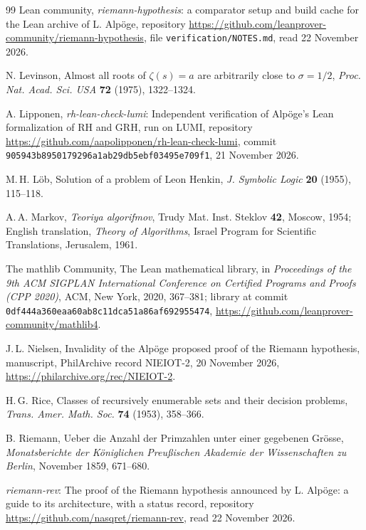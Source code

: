 \documentclass[11pt]{article}
\theoremstyle{definition}
\theoremstyle{remark}
\begin{document}
\begin{thebibliography}{99}
 Lean community, \emph{riemann-hypothesis}: a comparator setup and build cache for the Lean archive of L. Alp\"oge, repository \url{https://github.com/leanprover-community/riemann-hypothesis}, file \nolinkurl{verification/NOTES.md}, read 22 November 2026.

 N. Levinson, Almost all roots of $\zeta(s)=a$ are arbitrarily close to $\sigma=1/2$, \emph{Proc. Nat. Acad. Sci. USA} \textbf{72} (1975), 1322--1324.

 A. Lipponen, \emph{rh-lean-check-lumi}: Independent verification of Alp\"oge's Lean formalization of RH and GRH, run on LUMI, repository \url{https://github.com/aapolipponen/rh-lean-check-lumi}, commit \nolinkurl{905943b8950179296a1ab29db5ebf03495e709f1}, 21 November 2026.

 M.\,H. L\"ob, Solution of a problem of Leon Henkin, \emph{J. Symbolic Logic} \textbf{20} (1955), 115--118.

 A.\,A. Markov, \emph{Teoriya algorifmov}, Trudy Mat. Inst. Steklov \textbf{42}, Moscow, 1954; English translation, \emph{Theory of Algorithms}, Israel Program for Scientific Translations, Jerusalem, 1961.

 The mathlib Community, The Lean mathematical library, in \emph{Proceedings of the 9th ACM SIGPLAN International Conference on Certified Programs and Proofs (CPP 2020)}, ACM, New York, 2020, 367--381; library at commit \nolinkurl{0df444a360eaa60ab8c11dca51a86af692955474}, \url{https://github.com/leanprover-community/mathlib4}.

 J.\,L. Nielsen, Invalidity of the Alp\"oge proposed proof of the Riemann hypothesis, manuscript, PhilArchive record NIEIOT-2, 20 November 2026, \url{https://philarchive.org/rec/NIEIOT-2}.

 H.\,G. Rice, Classes of recursively enumerable sets and their decision problems, \emph{Trans. Amer. Math. Soc.} \textbf{74} (1953), 358--366.

 B. Riemann, Ueber die Anzahl der Primzahlen unter einer gegebenen Gr\"osse, \emph{Monatsberichte der K\"oniglichen Preu\ss ischen Akademie der Wissenschaften zu Berlin}, November 1859, 671--680.

 \emph{riemann-rev}: The proof of the Riemann hypothesis announced by L. Alp\"oge: a guide to its architecture, with a status record, repository \url{https://github.com/nasqret/riemann-rev}, read 22 November 2026.


\end{thebibliography}
\end{document}
